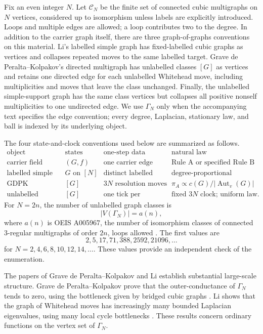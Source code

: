 \documentclass[11pt]{article}
\newcommand{\G}{\Gamma}
\newcommand{\C}{\mathcal C}
\newcommand{\Aut}{\operatorname{Aut}}
\theoremstyle{definition}
\begin{document}
Fix an even integer $N$. Let $\C_N$ be the finite set of connected cubic
multigraphs on $N$ vertices, considered up to isomorphism unless labels are
explicitly introduced. Loops and multiple edges are allowed; a loop contributes
two to the degree. In addition to the carrier graph itself, there are three
graph-of-graphs conventions on this material. Li's labelled simple graph has
fixed-labelled cubic graphs as vertices and collapses repeated moves to the
same labelled target.  Grave de Peralta--Kolpakov's directed multigraph has
unlabelled classes $[G]$ as vertices and retains one directed edge for each
unlabelled Whitehead move, including multiplicities and moves that leave the class unchanged.
Finally, the unlabelled simple-support graph has the same class vertices but
collapses all positive nonself multiplicities to one undirected edge. We use
$\G_N$ only when the accompanying text specifies the edge convention; every
degree, Laplacian, stationary law, and ball is indexed by its underlying
object.

The four state-and-clock conventions used below are summarized as follows.
{\small
\[
\begin{array}{c|c|c|c}
\text{object}&\text{states}&\text{one-step data}&\text{natural law}\\ \hline
\text{carrier field}&(G,f)&\text{one carrier edge and resolution}
    &\text{Rule A or specified Rule B}\\
\text{labelled simple GoG}&G\text{ on }[N]&\text{distinct labelled targets}
    &\text{degree-proportional}\\
\text{GDPK multiplicity chain}&[G]&3N\text{ resolution moves}
    &\pi_A\propto c(G)/|\Aut_v(G)|\\
\text{unlabelled simple support}&[G]&\text{one tick per distinct target}
    &\text{fixed }3N\text{ clock; uniform law}.
\end{array}
\]
}
For $N=2n$, the number of unlabelled graph classes is
\[
    |V(\G_N)|=a(n),
\]
where $a(n)$ is OEIS A005967, the number of isomorphism classes of connected
3-regular multigraphs of order $2n$, loops allowed \cite{oeis-a005967}.  The
first values are
\[
    2,5,17,71,388,2592,21096,\ldots
\]
for $N=2,4,6,8,10,12,14,\ldots$. These values provide an independent
check of the enumeration.

The papers of Grave de Peralta--Kolpakov and Li establish substantial
large-scale structure.  Grave de Peralta--Kolpakov prove that the
outer-conductance of $\G_N$ tends to zero, using the bottleneck given by
bridged cubic graphs \cite{gdp-kolpakov}.  Li shows that the graph of Whitehead
moves has increasingly many bounded Laplacian eigenvalues, using many local
cycle bottlenecks \cite{li}.  These results concern ordinary functions on the
vertex set of $\G_N$.
\end{document}
